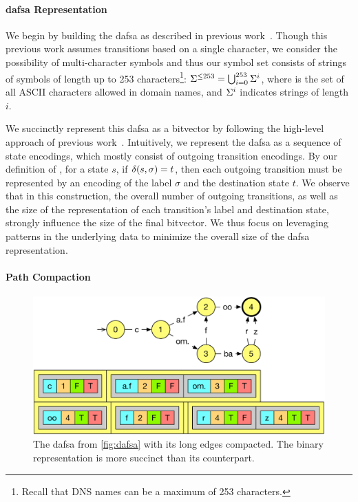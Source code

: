 \paragraph{\ac{dafsa} Representation}

We begin by building the \ac{dafsa} as described in previous
work~\cite{daciuk2000incremental}. Though this previous work assumes transitions
based on a single character, we consider the possibility of multi-character
symbols and thus our symbol set consists of strings of symbols of
length up to 253 characters\footnote{Recall that DNS names can be a maximum of 253 characters.}:
$\Sigma^{\le 253} = \bigcup_{i=0}^{253} \Sigma^i$, 
where \symbols is the set of all ASCII characters allowed in domain names,
and $\Sigma^i$ indicates strings of length $i$.

We succinctly represent this \ac{dafsa} as a bitvector by following the
high-level approach of previous work~\cite{daciuk2012smaller}. Intuitively, we
represent the \ac{dafsa} as a sequence of state encodings, which mostly consist
of outgoing transition encodings. By our definition of \transfunc, for a state
$s$, if $\delta(s, \sigma) = t$, then each outgoing transition must be
represented by an encoding of the label $\sigma$ and the destination state $t$.
We observe that in this construction, the overall number of outgoing
transitions, as well as the size of the representation of each transition's
label and destination state, strongly influence the size of the final bitvector.
We thus focus on leveraging patterns in the underlying data to minimize the
overall size of the \ac{dafsa} representation.

\paragraph{Path Compaction}

\begin{figure}
  \centering
  \includegraphics[width=\linewidth]{fig/dafsa_compact}
  \caption{The \ac{dafsa} from \autoref{fig:dafsa} with its long edges
  compacted. The binary representation is more succinct than its counterpart.}
  \label{fig:dafsa_compact}
\end{figure}

